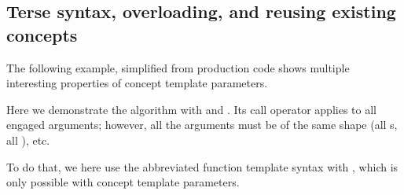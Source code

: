 \documentclass{wg21}
\begin{document}
%
%
%
%
%
%
%
%
%
%

\pagebreak

\subsection{Terse syntax, overloading, and reusing existing concepts}

The following example, simplified from production code shows multiple interesting properties of concept template parameters.

Here we demonstrate the algorithm  with  and .
Its call operator applies  to all engaged arguments; however, all the arguments must be of the same shape (all s, all ), etc.

To do that, we here use the abbreviated function template syntax with , which is only possible with concept template parameters.
\end{document}
